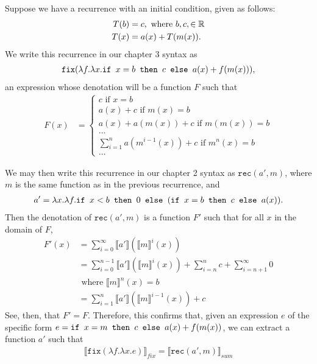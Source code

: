 Suppose we have a recurrence with an initial condition, given as follows:
\begin{align*}
T(b) &= c, \text{ where } b, c,  \in \mathbb{R} \\
T(x) &= a(x) + T(m(x)).
\end{align*}
We write this recurrence in our chapter 3 syntax as 
\begin{align*}
\texttt{fix}(\lambda f.\lambda x. \texttt{if } x = b \texttt{ then } c \texttt{ else } a(x) + f(m(x))),
\end{align*}
an expression whose denotation will be a function $F$ such that
\begin{align*}
F(x) &=
\begin{cases}
c \text{ if } x = b \\
a(x) + c \text{ if } m(x) = b \\
a(x) + a(m(x)) + c \text{ if } m(m(x)) = b \\
\ldots \\
\sum_{i=1}^{n} a(m^{i-1}(x)) + c \text{ if } m^n(x) = b \\
\ldots
\end{cases}
\end{align*}

We may then write this recurrence in our chapter 2 syntax as $\texttt{rec}(a',m)$, where $m$ is the same function
as in the previous recurrence, and
\begin{align*}
a' = \lambda x.\lambda f. \texttt{if } x < b \texttt{ then } 0 \texttt{ else } (\texttt{if } x = b \texttt{ then } c \texttt{ else } a(x)).
\end{align*}
Then the denotation of $\texttt{rec}(a',m)$ is a function $F'$ such that for all $x$ in the domain of $F$, 
\begin{align*}
F'(x) &= \sum_{i=0}^{\infty} \llbracket a' \rrbracket(\llbracket m \rrbracket^i(x)) \\
&= \sum_{i=0}^{n-1} \llbracket a' \rrbracket( \llbracket m \rrbracket^i(x)) + \sum_{i=n}^n c + \sum_{i = n+1}^{\infty} 0 \\
&\text{ where } \llbracket m \rrbracket^n(x) = b \\
&= \sum_{i=1}^{n}\llbracket a' \rrbracket ( \llbracket m \rrbracket^{i-1}(x)) + c
\end{align*}
See, then, that $F' = F$. Therefore, this confirms that, given an expression $e$ of the specific form
$e = \texttt{if } x = m \texttt{ then } c \texttt{ else } a(x) + f(m(x))$, we can extract a function $a'$ such that 
\begin{align*}
\llbracket \texttt{fix}(\lambda f. \lambda x.e) \rrbracket_{fix} = \llbracket \texttt{rec}(a',m)\rrbracket_{sum}
\end{align*}





 